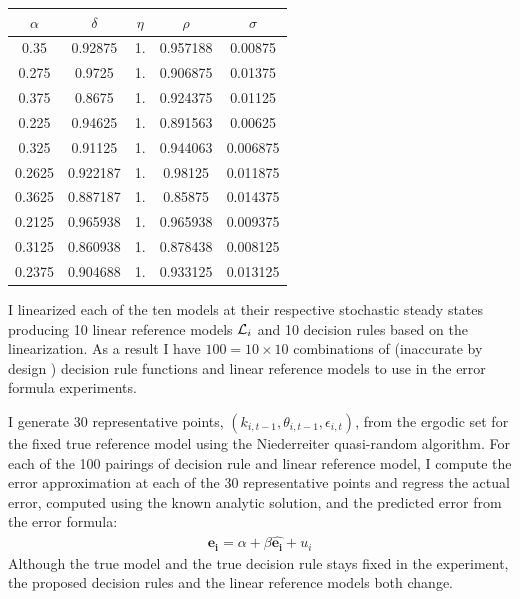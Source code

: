 \documentclass[12pt]{article}
\begin{document}
\vspace{.2in}



   \begin{tabular}{|c|c|c|c|c|}
\hline
\multicolumn{1}{|c|}{$\alpha$}&
\multicolumn{1}{|c|}{$\delta$}&
\multicolumn{1}{|c|}{$\eta$}&
\multicolumn{1}{|c|}{$\rho$}&
\multicolumn{1}{|c|}{$\sigma$}\\
\hline
                   0.35 & 0.92875 & 1. & 0.957188 & 0.00875 \\
\hline
                   0.275 & 0.9725 & 1. & 0.906875 & 0.01375 \\
\hline
                   0.375 & 0.8675 & 1. & 0.924375 & 0.01125 \\
\hline
                   0.225 & 0.94625 & 1. & 0.891563 & 0.00625 \\
\hline
                   0.325 & 0.91125 & 1. & 0.944063 & 0.006875 \\
\hline
                   0.2625 & 0.922187 & 1. & 0.98125 & 0.011875 \\
\hline
                   0.3625 & 0.887187 & 1. & 0.85875 & 0.014375 \\
\hline
                   0.2125 & 0.965938 & 1. & 0.965938 & 0.009375 \\
\hline
                   0.3125 & 0.860938 & 1. & 0.878438 & 0.008125 \\
\hline
                   0.2375 & 0.904688 & 1. & 0.933125 & 0.013125 \\
\hline
                  \end{tabular}


\vspace{.2in}



I linearized each of the ten models at their respective stochastic steady
states producing 10 linear reference models ${\mathcal{L}}_i$ and 10 decision rules
based on the linearization. 
As a result I have $100=10 \times 10$ combinations of (inaccurate by design ) decision rule functions
 and
linear reference models to use in the error formula experiments.


I generate 30 representative points, $(k_{i,t-1},\theta_{i,t-1},\epsilon_{i,t})$, from the ergodic set for the fixed true reference model
using the Niederreiter quasi-random algorithm.
For each of the 100 pairings of decision rule and linear reference model,
I compute the error approximation at each of the 30 representative points
and regress the actual error, computed using the known analytic solution, and the predicted error from the error formula:
\begin{gather*}
  \mathbf{e_i}=\alpha + \beta   \hat{\mathbf{e_i}} +u_i
\end{gather*}
Although the true model and the true decision rule stays 
fixed in the experiment, the
  proposed decision rules and the linear reference models both change.
\end{document}
